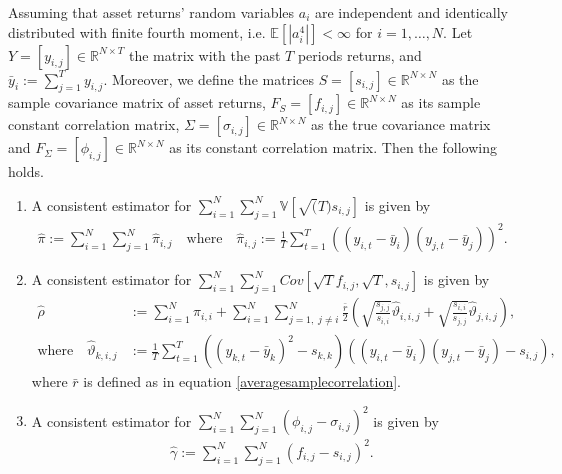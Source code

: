     	\begin{theorem}
    	    Assuming that asset returns' random variables $a_i$ are independent and identically distributed with finite fourth moment, i.e. $\mathbb{E}[|a_i^4|] < \infty$ for $i=1, \dots, N$. Let $Y = [y_{i,j}] \in \mathbb{R}^{N \times T}$ the matrix with the past $T$ periods returns, and $\bar{y}_i := \sum_{j=1}^T y_{i,j}$. Moreover, we define the matrices $S = [s_{i,j}] \in \mathbb{R}^{N \times N}$ as the sample covariance matrix of asset returns, $F_S = [f_{i,j}] \in \mathbb{R}^{N \times N}$ as its sample constant correlation matrix, $\Sigma = [\sigma_{i,j}] \in \mathbb{R}^{N \times N}$ as the true covariance matrix and $F_\Sigma = [\phi_{i,j}] \in \mathbb{R}^{N \times N}$ as its constant correlation matrix. Then the following holds.
    	    \begin{enumerate}
    	        \item A consistent estimator for $\sum_{i=1}^N \sum_{j=1}^N \mathbb{V}[\sqrt(T) s_{i,j}]$ is given by
    	        \begin{align*}
        	        \hat{\pi} := \sum_{i=1}^N \sum_{j=1}^N \hat{\pi}_{i,j} \quad \text{where} \quad \hat{\pi}_{i,j} := \frac{1}{T} \sum_{t=1}^T \left( (y_{i,t} - \bar{y}_{i}) (y_{j,t} - \bar{y}_{j}) \right)^2.
        	    \end{align*}
        	    
        	    \item A consistent estimator for $\sum_{i=1}^N \sum_{j=1}^N Cov[\sqrt{T} f_{i,j}, \sqrt{T}, s_{i,j}]$ is given by
        	    \begin{align*}
        	        \hat{\rho} &:= \sum_{i=1}^N \hat{\pi}_{i,i} + \sum_{i=1}^N \sum_{j=1, \; j \neq i}^N \frac{\bar{r}}{2} \left( \sqrt{\frac{s_{j,j}}{s_{i,i}}} \hat{\vartheta}_{i,i,j} + \sqrt{\frac{s_{i,i}}{s_{j,j}}} \hat{\vartheta}_{j,i,j} \right), \\
        	        \text{where} \quad \hat{\vartheta}_{k,i,j} &:= \frac{1}{T} \sum_{t=1}^T \left( (y_{k,t} - \bar{y}_k)^2 - s_{k,k} \right) \left( (y_{i,t} - \bar{y}_i) (y_{j,t} - \bar{y}_j) - s_{i,j} \right),
        	    \end{align*}
        	    where $\bar{r}$ is defined as in equation \ref{averagesamplecorrelation}.
        	    
        	    \item A consistent estimator for $\sum_{i=1}^N \sum_{j=1}^N (\phi_{i,j} - \sigma_{i,j})^2$ is given by
        	    \begin{align*}
        	        \hat{\gamma} := \sum_{i=1}^N \sum_{j=1}^N (f_{i,j} - s_{i,j})^2.
        	    \end{align*}
        	    

\end{enumerate}
\end{theorem}

